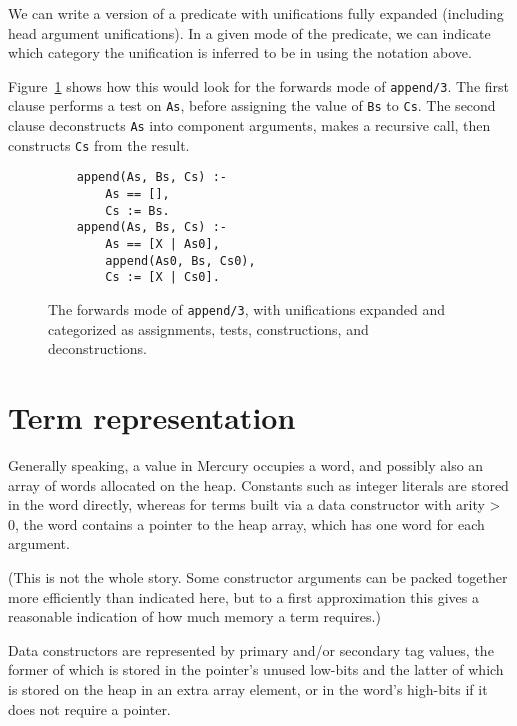 We can write a version of a predicate
with unifications fully expanded
(including head argument unifications).
In a given mode of the predicate,
we can indicate which category
the unification is inferred to be in
using the notation above.

Figure~\ref{fig:forwards-append}
shows how this would look
for the forwards mode of \texttt{append/3}.
The first clause performs a test on \texttt{As},
before assigning the value of \texttt{Bs} to \texttt{Cs}.
The second clause deconstructs \texttt{As}
into component arguments,
makes a recursive call,
then constructs \texttt{Cs} from the result.

\begin{figure}
\begin{verbatim}
    append(As, Bs, Cs) :-
        As == [],
        Cs := Bs.
    append(As, Bs, Cs) :-
        As == [X | As0],
        append(As0, Bs, Cs0),
        Cs := [X | Cs0].
\end{verbatim}
\caption{
The forwards mode of \texttt{append/3},
with unifications expanded and categorized as
assignments, tests, constructions, and deconstructions.
\label{fig:forwards-append}
}
\end{figure}


\section{Term representation}
\label{sec:term-rep}

Generally speaking,
a value in Mercury occupies a word,
and possibly also an array of words allocated on the heap.
Constants such as integer literals
are stored in the word directly,
whereas for terms built via a data constructor with arity > 0,
the word contains a pointer to the heap array,
which has one word for each argument.

(This is not the whole story.
Some constructor arguments can be packed together
more efficiently than indicated here,
but to a first approximation
this gives a reasonable indication of
how much memory a term requires.)

Data constructors are represented by
primary and/or secondary tag values,
the former of which is stored in the pointer's unused low-bits
and the latter of which is stored on the heap
in an extra array element,
or in the word's high-bits if it does not require a pointer.

